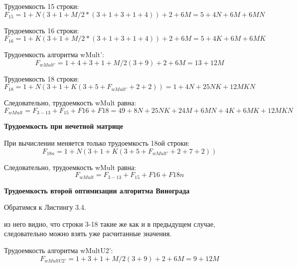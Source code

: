 \documentclass[12pt]{report}
\begin{document}
Трудоемкость 15 строки:
\begin{equation}
	F_{15} = 1 + N(3 + 1 + M/2*(3 + 1 + 3 + 1 + 4)) + 2 + 6M = 5 + 4N + 6M + 6MN
\end{equation}

Трудоемкость 16 строки:
\begin{equation}
	F_{16} = 1 + K(3 + 1 + M/2*(3 + 1 + 3 + 1 + 4)) + 2 + 6M = 5 + 4K + 6M + 6MK
\end{equation}

Трудоемкость алгоритма wMult':
\begin{equation}
	F_{wMult'} = 1 + 4 + 3 + 1 + M/2(3 + 9) + 2 + 6M = 13 + 12M
\end{equation}

Трудоемкость 18 строки:
\begin{equation}
	F_{18} = 1 + N(3 + 1 + K(3 + 5 + F_{wMult'} + 2 + 2)) = 1 + 4N + 25NK + 12MKN
\end{equation}

Следовательно, трудоемкость wMult равна:
\begin{equation}
	F_{wMult} = F_{3-13} + F_{15} + F{16} + F{18}  = 49 + 8N + 25NK + 24M + 6MN + 4K + 6MK + 12MKN
\end{equation}

\begin{center}
\textbf{Трудоемкость при нечетной матрице}
\end{center}

	При вычислении меняется только трудоемкость 18ой строки:
\begin{equation}
	F_{18n} = 1 + N(3 + 1 + K(3 + 5 + F_{wMult'} + 2 +  7 + 2))
\end{equation}

Следовательно, трудоемкость wMult равна:
\begin{equation}
	F_{wMult} = F_{3-13} + F_{15} + F{16} + F{18n} 
\end{equation}

\begin{center}
\textbf{Трудоемкость второй оптимизации алгоритма Винограда}
\end{center}

Обратимся к Листингу 3.4.

из него видно, что строки 3-18 такие же как и в предыдущем случае, следовательно можно взять уже расчитанные значения.

Трудоемкость алгоритма wMultU2':
\begin{equation}
	F_{wMultU2'} = 1 + 3 + 1 + M/2(3 + 9) + 2 + 6M = 9 + 12M
\end{equation}
\end{document}
